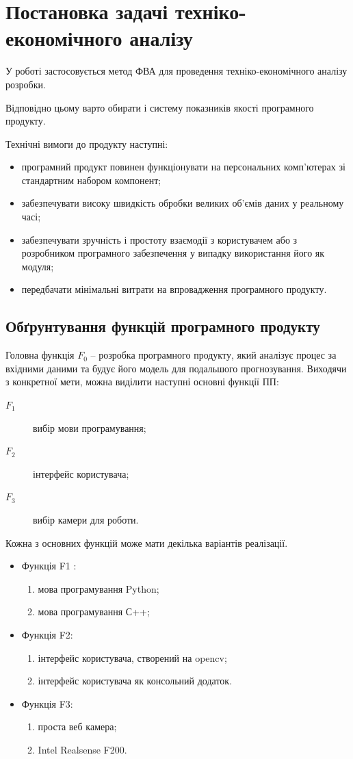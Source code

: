 \section{Постановка задачі техніко-економічного аналізу}
У роботі застосовується метод ФВА для проведення техніко-економічного аналізу розробки.

Відповідно цьому варто обирати і систему показників якості програмного продукту. 

Технічні вимоги до продукту наступні:
\begin{itemize}
	\item програмний продукт повинен функціонувати на персональних комп'ю\-терах зі стандартним набором компонент;
	\item забезпечувати високу швидкість обробки великих об'ємів даних у реальному часі;
	\item забезпечувати зручність і простоту взаємодії з користувачем або з розробником програмного забезпечення у випадку використання його як модуля;
	\item передбачати мінімальні витрати на впровадження програмного продукту.
\end{itemize}

\subsection{Обґрунтування функцій програмного продукту}
Головна функція $F_0$ – розробка програмного продукту, який аналізує процес за вхідними даними та будує його модель для подальшого прогнозування. Виходячи з конкретної мети, можна виділити наступні основні функції ПП:
\begin{description}
	\item[$F_1$] вибір мови програмування;
	\item[$F_2$] інтерфейс користувача;
	\item[$F_3$] вибір камери для роботи.
\end{description}


Кожна з основних функцій може мати декілька варіантів реалізації.
\begin{itemize}
\item Функція F1 :
	\begin{enumerate}
		\item мова програмування Python;
		\item мова програмування С++;
	\end{enumerate}
\item Функція F2:
	\begin{enumerate}
		\item інтерфейс користувача, створений на opencv;
		\item інтерфейс користувача як консольний додаток.
	\end{enumerate}
\item Функція F3:
	\begin{enumerate}
		\item проста веб камера;
		\item Intel Realsense F200.
	\end{enumerate}
\end{itemize}

